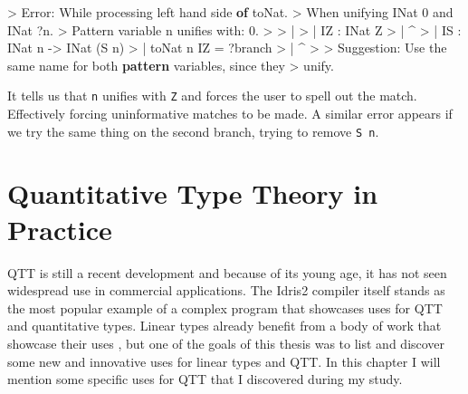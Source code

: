 \documentclass[
]{article}
\newenvironment{Shaded}{}{}
\newcommand{\DataTypeTok}[1]{\textcolor[rgb]{0.56,0.13,0.00}{#1}}
\newcommand{\DecValTok}[1]{\textcolor[rgb]{0.25,0.63,0.44}{#1}}
\newcommand{\FunctionTok}[1]{\textcolor[rgb]{0.02,0.16,0.49}{#1}}
\newcommand{\KeywordTok}[1]{\textcolor[rgb]{0.00,0.44,0.13}{\textbf{#1}}}
\newcommand{\NormalTok}[1]{#1}
\newcommand{\OperatorTok}[1]{\textcolor[rgb]{0.40,0.40,0.40}{#1}}
\newcommand{\OtherTok}[1]{\textcolor[rgb]{0.00,0.44,0.13}{#1}}
\begin{document}
\begin{Shaded}
\begin{Highlighting}[]
\OperatorTok{\textgreater{}} \DataTypeTok{Error}\OperatorTok{:} \DataTypeTok{While}\NormalTok{ processing left hand side }\KeywordTok{of}\NormalTok{ toNat}\OperatorTok{.} 
\OperatorTok{\textgreater{}}   \DataTypeTok{When}\NormalTok{ unifying }\DataTypeTok{INat} \DecValTok{0} \FunctionTok{and} \DataTypeTok{INat} \OperatorTok{?}\NormalTok{n}\OperatorTok{.}
\OperatorTok{\textgreater{}} \DataTypeTok{Pattern}\NormalTok{ variable n unifies with}\OperatorTok{:} \DecValTok{0}\OperatorTok{.}
\OperatorTok{\textgreater{}} 
\OperatorTok{\textgreater{}}     \OperatorTok{|}
\OperatorTok{\textgreater{}}     \OperatorTok{|}   \DataTypeTok{IZ} \OperatorTok{:} \DataTypeTok{INat} \DataTypeTok{Z}
\OperatorTok{\textgreater{}}     \OperatorTok{|}             \OperatorTok{\^{}}
\OperatorTok{\textgreater{}}     \OperatorTok{|}   \DataTypeTok{IS} \OperatorTok{:} \DataTypeTok{INat}\NormalTok{ n }\OtherTok{{-}\textgreater{}} \DataTypeTok{INat}\NormalTok{ (}\DataTypeTok{S}\NormalTok{ n)}
\OperatorTok{\textgreater{}}     \OperatorTok{|}\NormalTok{  toNat n }\DataTypeTok{IZ} \OtherTok{=} \OperatorTok{?}\NormalTok{branch}
\OperatorTok{\textgreater{}}     \OperatorTok{|}        \OperatorTok{\^{}}
\OperatorTok{\textgreater{}} 
\OperatorTok{\textgreater{}} \DataTypeTok{Suggestion}\OperatorTok{:} \DataTypeTok{Use}\NormalTok{ the same name for both }\KeywordTok{pattern}\NormalTok{ variables, since they }
\OperatorTok{\textgreater{}}\NormalTok{   unify}\OperatorTok{.}
\end{Highlighting}
\end{Shaded}

It tells us that \texttt{n} unifies with \texttt{Z} and forces the user
to spell out the match. Effectively forcing uninformative matches to be
made. A similar error appears if we try the same thing on the second
branch, trying to remove \texttt{S\ n}.

\newpage

\hypertarget{quantitative-type-theory-in-practice}{%
\section{Quantitative Type Theory in
Practice}\label{quantitative-type-theory-in-practice}}

\label {sec:qtt-practice}

QTT is still a recent development and because of its young age, it has
not seen widespread use in commercial applications. The Idris2 compiler
itself stands as the most popular example of a complex program that
showcases uses for QTT and quantitative types. Linear types already
benefit from a body of work that showcase their uses
\cite{linear_diff}\cite{linear_types_update}\cite{linear_types_session}\cite{linear_types_subst}\cite{actor_channels}\cite{linear_race}\cite{linear_use}\cite{once_upon_a_type}\cite{deforestation},
but one of the goals of this thesis was to list and discover some new
and innovative uses for linear types and QTT. In this chapter I will
mention some specific uses for QTT that I discovered during my study.
\end{document}
